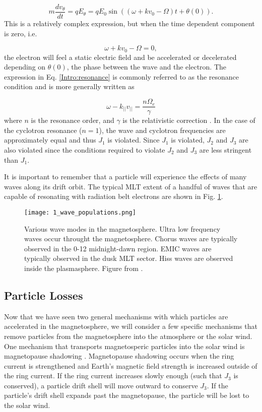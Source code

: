 \begin{equation}
m \frac{dv_\theta}{dt} = qE_\theta = qE_0 \sin{((\omega + kv_0 - \Omega)t + \theta(0))}.
\end{equation} This is a relatively complex expression, but when the time dependent component is zero, i.e. 

\begin{equation} \label{Intro:resonance}
\omega + kv_0 - \Omega = 0,
\end{equation} the electron will feel a static electric field and be accelerated or decelerated depending on $\theta(0)$, the phase between the wave and the electron. The expression in Eq. \ref{Intro:resonance} is commonly referred to as the resonance condition and is more generally written as 

\begin{equation} \label{Intro:resonance_general}
\omega - k_{||} v_{||} = \frac{n \Omega_e}{\gamma}
\end{equation} where $n$ is the resonance order, and $\gamma$ is the relativistic correction \citep[e.g.][]{Millan2007}. In the case of the cyclotron resonance ($n = 1$), the wave and cyclotron frequencies are approximately equal and thus $J_1$ is violated. Since $J_1$ is violated, $J_2$ and $J_3$ are also violated since the conditions required to violate $J_2$ and $J_3$ are less stringent than $J_1$. 

It is important to remember that a particle will experience the effects of many waves along its drift orbit. The typical MLT extent of a handful of waves that are capable of resonating with radiation belt electrons are shown in Fig. \ref{Intro:waves}.

\begin{figure}
\texttt{[image: 1\_wave\_populations.png]}
\caption{Various wave modes in the magnetosphere. Ultra low frequency waves occur throught the magnetosphere. Chorus waves are typically observed in the 0-12 midnight-dawn region. EMIC waves are typically observed in the dusk MLT sector. Hiss waves are observed inside the plasmasphere. Figure from \citet{Millan2007}.}
\label{Intro:waves}
\end{figure}

\subsection{Particle Losses}\label{Intro:losses}
Now that we have seen two general mechanisms with which particles are accelerated in the magnetosphere, we will consider a few specific mechanisms that remove particles from the magnetosphere into the atmosphere or the solar wind. One mechanism that transports magnetosperic particles into the solar wind is magnetopause shadowing \citep[e.g.][]{Ukhorskiy2006}. Magnetopause shadowing occurs when the ring current is strengthened and Earth's magnetic field strength is increased outside of the ring current. If the ring current increases slowly enough (such that $J_3$ is conserved), a particle drift shell will move outward to conserve $J_3$. If the particle's drift shell expands past the magnetopause, the particle will be lost to the solar wind.

